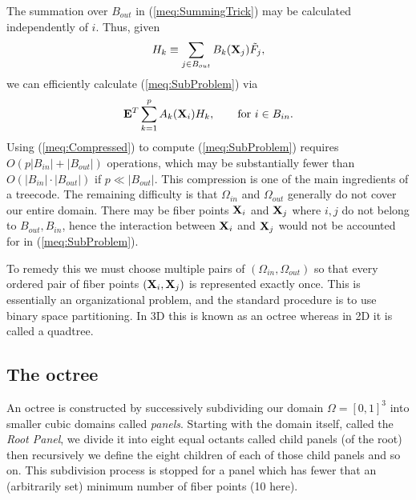 The summation over $B_{out}$ in (\ref{meq:SummingTrick}) may be calculated independently of $i$. Thus, given
\begin{equation}
H_k \equiv \sum_{j\in B_{out}} B_k(\mathbf{X}_j) \tilde{F}_j,
\label{meq:CombinedFarField}
\end{equation}
we can efficiently calculate (\ref{meq:SubProblem}) via
\begin{equation}
\mathbf{E}^T\displaystyle\sum_{k=1}^{p}A_k(\mathbf{X}_i)H_k, \qquad\text{for $i\in B_{in}$}.
\label{meq:Compressed}
\end{equation}
Using (\ref{meq:Compressed}) to compute (\ref{meq:SubProblem}) requires $O(p|B_{in}| + |B_{out}|)$ operations, which may be substantially fewer than $O(|B_{in}|\cdot |B_{out}|)$ if $p\ll |B_{out}|$. This compression is one of the main ingredients of a treecode. The remaining difficulty is that $\Omega_{in}$ and $\Omega_{out}$ generally do not cover our entire domain. There may be fiber points $\mathbf{X}_i$ and $\mathbf{X}_j$ where $i,j$ do not belong to $B_{out},B_{in}$, hence the interaction between $\mathbf{X}_i$ and $\mathbf{X}_j$ would not be accounted for in (\ref{meq:SubProblem}).

To remedy this we must choose multiple pairs of $\left(\Omega_{in},\Omega_{out}\right)$ so that every ordered pair of fiber points $\left(\mathbf{X}_i, \mathbf{X}_j\right)$ is represented exactly once. This is essentially an organizational problem, and the standard procedure is to use binary space partitioning. In 3D this is known as an octree whereas in 2D  it is called a quadtree.

\subsection{The octree}
An octree is constructed by successively subdividing our domain $\Omega = [0,1]^3$ into smaller cubic domains called {\em panels}. 
Starting with the domain itself, called the {\em Root Panel},  we divide it into eight equal octants called child panels (of the root)
then recursively we define the eight children of each of those child panels and so on. This subdivision process is stopped for a panel which has fewer that an (arbitrarily set) minimum number of fiber points (10 here). 

